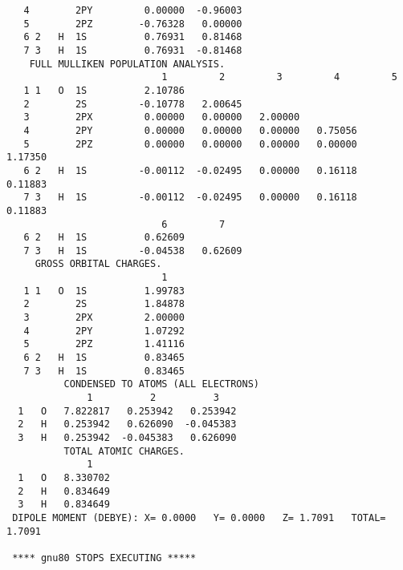 {\begin{verbatim}
   4        2PY         0.00000  -0.96003
   5        2PZ        -0.76328   0.00000
   6 2   H  1S          0.76931   0.81468
   7 3   H  1S          0.76931  -0.81468
    FULL MULLIKEN POPULATION ANALYSIS.
                           1         2         3         4         5
   1 1   O  1S          2.10786
   2        2S         -0.10778   2.00645
   3        2PX         0.00000   0.00000   2.00000
   4        2PY         0.00000   0.00000   0.00000   0.75056
   5        2PZ         0.00000   0.00000   0.00000   0.00000   1.17350
   6 2   H  1S         -0.00112  -0.02495   0.00000   0.16118   0.11883
   7 3   H  1S         -0.00112  -0.02495   0.00000   0.16118   0.11883
                           6         7
   6 2   H  1S          0.62609
   7 3   H  1S         -0.04538   0.62609
     GROSS ORBITAL CHARGES.
                           1
   1 1   O  1S          1.99783
   2        2S          1.84878
   3        2PX         2.00000
   4        2PY         1.07292
   5        2PZ         1.41116
   6 2   H  1S          0.83465
   7 3   H  1S          0.83465
          CONDENSED TO ATOMS (ALL ELECTRONS)
              1          2          3
  1   O   7.822817   0.253942   0.253942
  2   H   0.253942   0.626090  -0.045383
  3   H   0.253942  -0.045383   0.626090
          TOTAL ATOMIC CHARGES.
              1
  1   O   8.330702
  2   H   0.834649
  3   H   0.834649
 DIPOLE MOMENT (DEBYE): X= 0.0000   Y= 0.0000   Z= 1.7091   TOTAL= 1.7091

 **** gnu80 STOPS EXECUTING *****
\end{verbatim}
}
